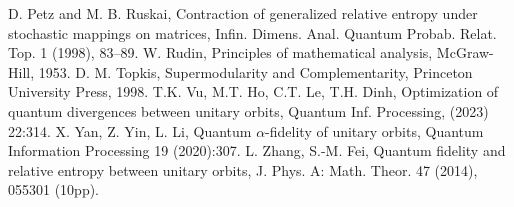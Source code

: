 \documentclass[10pt,reqno]{amsart}
\theoremstyle{break-italic}
\theoremstyle{break-italic}
\theoremstyle{break-italic}
\theoremstyle{break-italic}
\theoremstyle{break-italic}
\theoremstyle{break-italic}
\theoremstyle{break-italic}
\theoremstyle{break-italic}
\theoremstyle{break-roman}
\theoremstyle{standard}
\theoremstyle{varthm-roman}
\theoremstyle{varthm-italic}
\theoremstyle{varthm-roman-break}
\theoremstyle{varthm-italic-break}
\theoremstyle{varthm-roman-no-punctuation}
\theoremstyle{varthm-italic-no-punctuation}
\numberwithin{equation}{section}
\begin{document}
\begin{thebibliography}{}
 D. Petz and M. B. Ruskai, Contraction of generalized relative entropy under stochastic mappings on matrices,  Infin. Dimens. Anal. Quantum Probab. Relat. Top. 1 (1998), 83–89.
 W. Rudin, Principles of mathematical analysis, McGraw-Hill, 1953.
 D. M. Topkis, Supermodularity and Complementarity, Princeton University Press, 1998.
 T.K. Vu, M.T. Ho, C.T. Le, T.H. Dinh, Optimization of quantum divergences between unitary orbits, Quantum Inf. Processing, (2023) 22:314.
 X. Yan, Z. Yin, L. Li, Quantum $\alpha$-fidelity of unitary orbits, Quantum Information Processing  19 (2020):307.
 L. Zhang, S.-M. Fei, Quantum fidelity and relative entropy between unitary orbits, J. Phys. A: Math. Theor. 47 (2014), 055301 (10pp).
\end{thebibliography}
\end{document}
